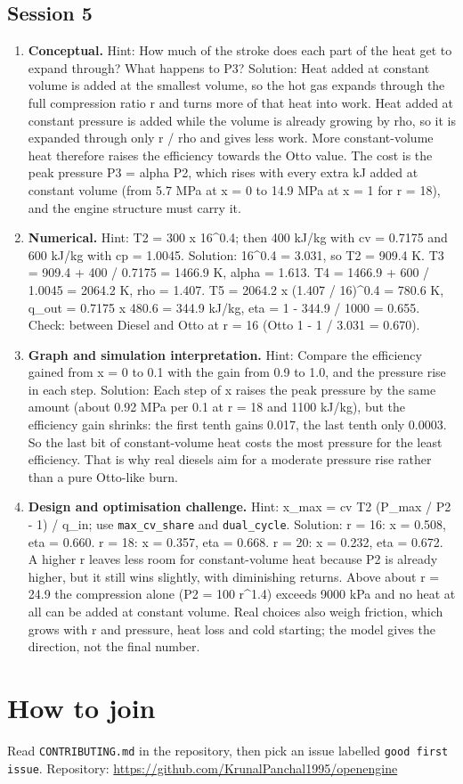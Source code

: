 \documentclass[11pt,a4paper]{article}
\begin{document}
\subsection*{Session 5}
\begin{enumerate}[nosep]
\item \textbf{Conceptual.} Hint: How much of the stroke does each part of the heat get to expand through? What happens to P3? Solution: Heat added at constant volume is added at the smallest volume, so the hot gas expands through the full compression ratio r and turns more of that heat into work. Heat added at constant pressure is added while the volume is already growing by rho, so it is expanded through only r / rho and gives less work. More constant-volume heat therefore raises the efficiency towards the Otto value. The cost is the peak pressure P3 = alpha P2, which rises with every extra kJ added at constant volume (from 5.7 MPa at x = 0 to 14.9 MPa at x = 1 for r = 18), and the engine structure must carry it.
\item \textbf{Numerical.} Hint: T2 = 300 x 16\textasciicircum{}0.4; then 400 kJ/kg with cv = 0.7175 and 600 kJ/kg with cp = 1.0045. Solution: 16\textasciicircum{}0.4 = 3.031, so T2 = 909.4 K. T3 = 909.4 + 400 / 0.7175 = 1466.9 K, alpha = 1.613. T4 = 1466.9 + 600 / 1.0045 = 2064.2 K, rho = 1.407. T5 = 2064.2 x (1.407 / 16)\textasciicircum{}0.4 = 780.6 K, q\_out = 0.7175 x 480.6 = 344.9 kJ/kg, eta = 1 - 344.9 / 1000 = 0.655. Check: between Diesel and Otto at r = 16 (Otto 1 - 1 / 3.031 = 0.670).
\item \textbf{Graph and simulation interpretation.} Hint: Compare the efficiency gained from x = 0 to 0.1 with the gain from 0.9 to 1.0, and the pressure rise in each step. Solution: Each step of x raises the peak pressure by the same amount (about 0.92 MPa per 0.1 at r = 18 and 1100 kJ/kg), but the efficiency gain shrinks: the first tenth gains 0.017, the last tenth only 0.0003. So the last bit of constant-volume heat costs the most pressure for the least efficiency. That is why real diesels aim for a moderate pressure rise rather than a pure Otto-like burn.
\item \textbf{Design and optimisation challenge.} Hint: x\_max = cv T2 (P\_max / P2 - 1) / q\_in; use \texttt{max\_cv\_share} and \texttt{dual\_cycle}. Solution: r = 16: x = 0.508, eta = 0.660. r = 18: x = 0.357, eta = 0.668. r = 20: x = 0.232, eta = 0.672. A higher r leaves less room for constant-volume heat because P2 is already higher, but it still wins slightly, with diminishing returns. Above about r = 24.9 the compression alone (P2 = 100 r\textasciicircum{}1.4) exceeds 9000 kPa and no heat at all can be added at constant volume. Real choices also weigh friction, which grows with r and pressure, heat loss and cold starting; the model gives the direction, not the final number.
\end{enumerate}
\section{How to join}
Read \texttt{CONTRIBUTING.md} in the repository, then pick an issue labelled \texttt{good first issue}. Repository: \url{https://github.com/KrunalPanchal1995/openengine}
\end{document}
